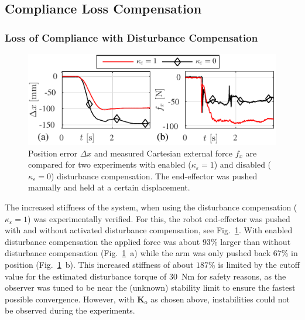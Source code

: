 \subsection{Compliance Loss Compensation}
\label{sec:comp_obs}

\subsubsection{Loss of Compliance with Disturbance Compensation}
\label{sec:comp_obs_loss}
%
\begin{figure}
\centering
\includegraphics[]{./figures/ObserverStiff/ObsFeedthroughStiff_compare.pdf}
\caption{Position error $\Delta x$ and measured Cartesian external force $f_x$ are compared for two experiments with enabled ($\kappa_{\varepsilon}=1$) and disabled ($\kappa_{\varepsilon}=0$) disturbance compensation.
The end-effector was pushed manually and held at a certain displacement.}
\label{fig:stiff_observer_feedthrough}
\SkipBeforePicture
\end{figure}
%
The increased stiffness of the system, when using the disturbance compensation ($\kappa_{\varepsilon}=1$) was experimentally verified. For this, the robot end-effector was pushed with and without activated disturbance compensation, see Fig.~\ref{fig:stiff_observer_feedthrough}.
With enabled disturbance compensation the applied force was about $93$\% larger than without disturbance compensation (Fig.~\ref{fig:stiff_observer_feedthrough}~a) while the arm was only pushed back $67$\% in position (Fig.~\ref{fig:stiff_observer_feedthrough}~b).
This increased stiffness of about $187$\% is limited by the cutoff value for the estimated disturbance torque of $30$~Nm for safety reasons, as the observer was tuned to be near the (unknown) stability limit to ensure the fastest possible convergence.
However, with $\bm{K}_\mathrm{o}$ as chosen above, instabilities could not be observed during the experiments.

